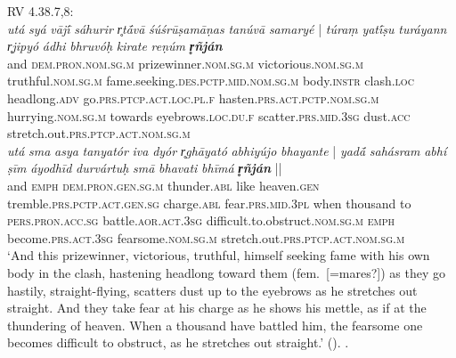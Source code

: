 \documentclass[output=paper,colorlinks,citecolor=brown]{langscibook}
\begin{document}
\begin{exe}
\begin{xlist}
RV 4.38.7,8:\\ \gll \textit{utá} \textit{syá} \textit{vājī́} \textit{sáhurir} \textit{r̥tā́vā}  \textit{śúśrūṣamāṇas} \textit{tanúvā} {\textit{samaryé} |} \textit{túraṃ} \textit{yatī́ṣu} \textit{turáyann} \textit{r̥jipyó} \textit{ádhi} \textit{bhruvóḥ} \textit{kirate} \textit{reṇúm}  {\textbf{\textit{r̥ñján}} }\\
and \textsc{dem.pron.nom.sg.m} prizewinner.\textsc{nom.sg.m} victorious.\textsc{nom.sg.m} truthful.\textsc{nom.sg.m} fame.seeking.\textsc{des.pctp.mid.nom.sg.m} body.\textsc{instr} clash.\textsc{loc} headlong.\textsc{adv} go.\textsc{prs.ptcp.act.loc.pl.f} hasten.\textsc{prs.act.pctp.nom.sg.m} hurrying.\textsc{nom.sg.m} towards eyebrows.\textsc{loc.du.f} scatter.\textsc{prs.mid.3sg} dust.\textsc{acc} stretch.out.\textsc{prs.ptcp.act.nom.sg.m}\\

\gll \textit{utá} \textit{sma} \textit{asya} \textit{tanyatór} \textit{iva} \textit{dyór}  \textit{r̥ghāyató} \textit{abhiyújo} {\textit{bhayante} |} \textit{yad{ā́}} \textit{sahásram} \textit{abhí} \textit{ṣīm} \textit{áyodhīd} \textit{durvártuḥ} \textit{smā} \textit{bhavati} \textit{bhīmá} {\textbf{\textit{r̥ñján}} ||}\\
and \textsc{emph} \textsc{dem.pron.gen.sg.m} thunder.\textsc{abl} like heaven.\textsc{gen} tremble.\textsc{prs.pctp.act.gen.sg} charge.\textsc{abl} fear.\textsc{prs.mid.3pl} when thousand to \textsc{pers.pron.acc.sg} battle.\textsc{aor.act.3sg} difficult.to.obstruct.\textsc{nom.sg.m} \textsc{emph} become.\textsc{prs.act.3sg} fearsome.\textsc{nom.sg.m} stretch.out.\textsc{prs.ptcp.act.nom.sg.m}\\

\glt `And this prizewinner, victorious, truthful, himself seeking fame with his own body in the clash, hastening headlong toward them (fem.\  [=mares?]) as they go hastily, straight-flying, scatters dust up to the eyebrows as he stretches out straight. And they take fear at his charge as he shows his mettle, as if at the thundering of heaven. When a thousand have battled him, the fearsome one becomes difficult to obstruct, as he stretches out straight.' (\citealt{JamisonBrereton2014}).
.\\
\smallskip


\end{xlist}
\end{exe}
\end{document}
